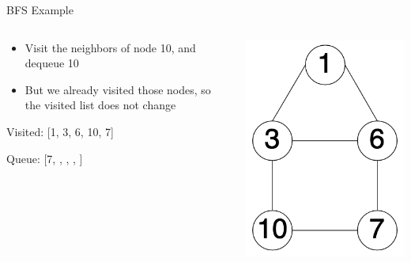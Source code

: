 \documentclass[
  ignorenonframetext,
]{beamer}
\begin{document}
\begin{frame}{BFS Example}
\protect\hypertarget{bfs-example-5}{}
\begin{columns}[T]
\begin{column}{0.6\textwidth}
\begin{itemize}
\item
  Visit the neighbors of node 10, and dequeue 10
\item
  But we already visited those nodes, so the visited list does not
  change \vspace{1cm}
\end{itemize}

Visited: {[}1, 3, 6, 10, 7{]}

Queue: {[}7, , , , {]}
\end{column}

\begin{column}{0.4\textwidth}
\includegraphics{images/graph-bfs.png}
\end{column}
\end{columns}
\end{frame}
\end{document}
